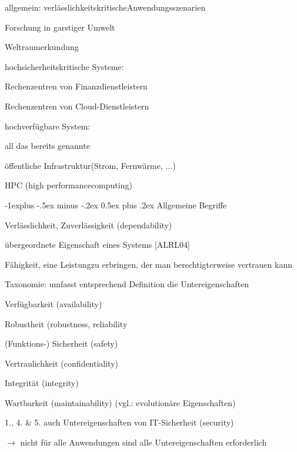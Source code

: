 \documentclass[a4paper]{article}
\makeatletter
\renewcommand{\subsection}{\@startsection{subsection}{2}{0mm}%
 {-1explus -.5ex minus -.2ex}%
 {0.5ex plus .2ex}%
 {\normalfont\normalsize\bfseries}}
\makeatother
\begin{document}
\begin{multicols}{3}
    \begin{itemize*}
        \item
        allgemein: verlässlichkeitskritischeAnwendungsszenarien
        \item
        Forschung in garstiger Umwelt
        \item
        Weltraumerkundung
        \item
        hochsicherheitskritische Systeme:
        \begin{itemize*}
            \item Rechenzentren von Finanzdienstleistern
            \item Rechenzentren von Cloud-Dienstleistern
        \end{itemize*}
        \item
        hochverfügbare System:
        \begin{itemize*}
            \item all das bereits genannte
            \item öffentliche Infrastruktur(Strom, Fernwärme, ...)
        \end{itemize*}
        \item
        HPC (high performancecomputing)
    \end{itemize*}


    \subsection{Allgemeine Begriffe}

    \begin{itemize*}
        \item
        Verlässlichkeit, Zuverlässigkeit (dependability)
        \item
        übergeordnete Eigenschaft eines Systems [ALRL04]
        \item
        Fähigkeit, eine Leistungzu erbringen, der man berechtigterweise
        vertrauen kann
        \item
        Taxonomie: umfasst entsprechend Definition die Untereigenschaften
        \begin{enumerate*}

            \item Verfügbarkeit (availability)
            \item Robustheit (robustness, reliability
            \item (Funktions-) Sicherheit (safety)
            \item Vertraulichkeit (confidentiality)
            \item Integrität (integrity)
            \item Wartbarkeit (maintainability) (vgl.: evolutionäre Eigenschaften)
        \end{enumerate*}
        \item
        1., 4. \& 5. auch Untereigenschaften von IT-Sicherheit (security)
        \item
        $\rightarrow$ nicht für alle Anwendungen sind alle
        Untereigenschaften erforderlich
    \end{itemize*}



\end{multicols}
\end{document}
